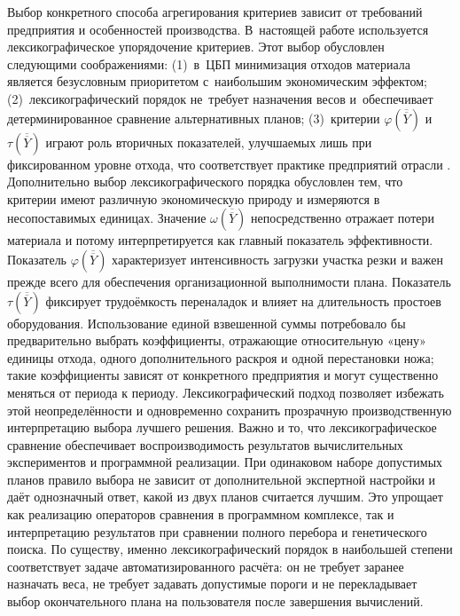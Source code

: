 Выбор конкретного способа агрегирования критериев зависит от требований предприятия и особенностей производства.
В~настоящей работе используется лексикографическое упорядочение критериев.
 Этот выбор обусловлен следующими соображениями:
(1)~в~ЦБП минимизация отходов материала является безусловным приоритетом с~наибольшим экономическим эффектом;
(2)~лексикографический порядок не~требует назначения весов и~обеспечивает детерминированное сравнение альтернативных планов;
(3)~критерии $\varphi(\overline{\overline{Y}})$ и $\tau(\overline{\overline{Y}})$ играют роль вторичных показателей, улучшаемых лишь при фиксированном уровне отхода, что соответствует практике предприятий отрасли \cite{haessler1991,melega2018review}.
 Дополнительно выбор лексикографического порядка обусловлен тем, что критерии имеют различную экономическую природу и измеряются в несопоставимых единицах. Значение $\omega(\overline{\overline{Y}})$ непосредственно отражает потери материала и потому интерпретируется как главный показатель эффективности. Показатель $\varphi(\overline{\overline{Y}})$ характеризует интенсивность загрузки участка резки и важен прежде всего для обеспечения организационной выполнимости плана. Показатель $\tau(\overline{\overline{Y}})$ фиксирует трудоёмкость переналадок и влияет на длительность простоев оборудования. Использование единой взвешенной суммы потребовало бы предварительно выбрать коэффициенты, отражающие относительную «цену» единицы отхода, одного дополнительного раскроя и одной перестановки ножа; такие коэффициенты зависят от конкретного предприятия и могут существенно меняться от периода к периоду. Лексикографический подход позволяет избежать этой неопределённости и одновременно сохранить прозрачную производственную интерпретацию выбора лучшего решения.
 Важно и то, что лексикографическое сравнение обеспечивает воспроизводимость результатов вычислительных экспериментов и программной реализации. При одинаковом наборе допустимых планов правило выбора не зависит от дополнительной экспертной настройки и даёт однозначный ответ, какой из двух планов считается лучшим. Это упрощает как реализацию операторов сравнения в программном комплексе, так и интерпретацию результатов при сравнении полного перебора и генетического поиска. По существу, именно лексикографический порядок в наибольшей степени соответствует задаче автоматизированного расчёта: он не требует заранее назначать веса, не требует задавать допустимые пороги и не перекладывает выбор окончательного плана на пользователя после завершения вычислений.
 
 
